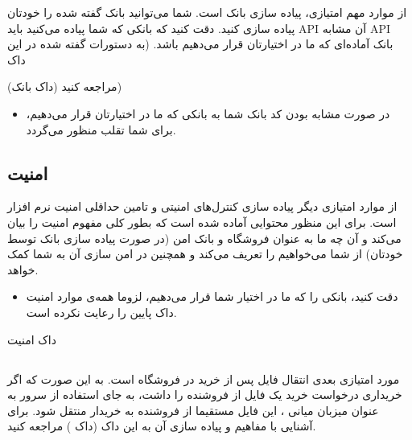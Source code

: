 \documentclass[]{article}
\begin{document}
از موارد مهم امتیازی، پیاده سازی بانک است. شما می‌توانید بانک گفته شده را خودتان پیاده سازی کنید. دقت کنید که بانکی که شما پیاده می‌کنید باید API آن مشابه API بانک آماده‌ای که ما در اختیارتان قرار می‌دهیم باشد. (‌به دستورات گفته شده در این داک

(\textcolor{CustomColor}{داک بانک})
  مراجعه کنید)
 


\begin{itemize}[label = $\star$]
\item

در صورت مشابه بودن کد بانک شما به بانکی که ما در اختیارتان قرار می‌دهیم،‌ برای شما \textcolor{CustomColor}{تقلب} منظور می‌گردد.


\end{itemize}



\subsection*{{\titr امنیت}}

از موارد امتیازی دیگر پیاده سازی کنترل‌های امنیتی و تامین حداقلی امنیت نرم افزار است. برای این منظور محتوایی آماده شده است که بطور کلی مفهوم امنیت را بیان می‌کند و آن چه ما به عنوان فروشگاه و بانک امن (در صورت پیاده سازی بانک توسط خودتان) از شما می‌خواهیم را تعریف می‌کند و همچنین در امن سازی آن به شما کمک خواهد.

\begin{itemize}[label = $\star$]
\item

دقت کنید، بانکی را که ما در اختیار شما قرار می‌دهیم، لزوما همه‌ی موارد امنیت داک پایین را رعایت نکرده است.

\end{itemize}

داک امنیت


\subsection*{{}}
\label{subsec:p2p}

مورد امتیازی بعدی انتقال  فایل پس از خرید در فروشگاه است. به این صورت که اگر خریداری درخواست خرید یک فایل از فروشنده را داشت،‌ به جای استفاده از سرور به عنوان میزبان میانی ، این فایل مستقیما از فروشنده به خریدار منتقل شود. برای آشنایی با مفاهیم  و پیاده سازی آن به این داک (\textcolor{CustomColor}{داک }) مراجعه کنید.
\end{document}
